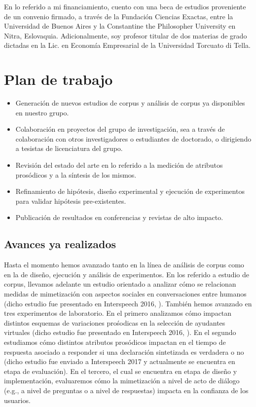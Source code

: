 \documentclass{article}
\begin{document}
En lo referido a mi financiamiento, cuento con una beca de estudios proveniente de un convenio firmado, a través de la Fundación Ciencias Exactas, entre la Universidad de Buenos Aires y la Constantine the Philosopher University en Nitra, Eslovaquia. Adicionalmente, soy profesor titular de dos materias de grado dictadas en la Lic. en Economía Empresarial de la Universidad Torcuato di Tella.


\section{Plan de trabajo}

\begin{itemize}

\item Generación de nuevos estudios de corpus y análisis de corpus ya disponibles en nuestro grupo.

\item Colaboración en proyectos del grupo de investigación, sea a través de colaboración con otros investigadores o estudiantes de doctorado, o dirigiendo a tesistas de licenciatura del grupo.

\item Revisión del estado del arte en lo referido a la medición de atributos prosódicos y a la síntesis de los mismos.

\item Refinamiento de hipótesis, diseño experimental y ejecución de experimentos para validar hipótesis pre-existentes.

\item Publicación de resultados en conferencias y revistas de alto impacto.

\end{itemize}

\subsection{Avances ya realizados}

Hasta el momento hemos avanzado tanto en la línea de análisis de corpus como en la de diseño, ejecución y análisis de experimentos. En los referido a estudio de corpus, llevamos adelante un estudio orientado a analizar cómo se relacionan medidas de mimetización con aspectos sociales en conversaciones entre humanos (dicho estudio fue presentado en Interspeech 2016, \cite{perez2016disentrainment}). También hemos avanzado en tres experimentos de laboratorio. En el primero analizamos cómo impactan distintos esquemas de variaciones prośodicas en la selección de ayudantes virtuales (dicho estudio fue presentado en Interspeech 2016, \cite{levitan2016implementing}). En el segundo estudiamos cómo distintos atributos prosódicos impactan en el tiempo de respuesta asociado a responder si una declaración sintetizada es verdadera o no (dicho estudio fue enviado a Interspeech 2017 y actualmente se encuentra en etapa de evaluación). En el tercero, el cual se encuentra en etapa de diseño y implementación, evaluaremos cómo la mimetización a nivel de acto de diálogo (e.g., a nivel de preguntas o a nivel de respuestas) impacta en la confianza de los usuarios.
\end{document}
